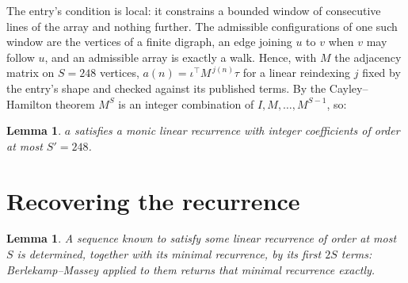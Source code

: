 \documentclass[11pt,a4paper]{article}
\theoremstyle{plain}
\newtheorem{lemma}[theorem]{Lemma}
\theoremstyle{definition}
\begin{document}
The entry's condition is local: it constrains a bounded window of consecutive lines of the
array and nothing further. The admissible configurations of one such window are the vertices
of a finite digraph, an edge joining $u$ to $v$ when $v$ may follow $u$, and an admissible
array is exactly a walk. Hence, with $M$ the adjacency matrix on $S=248$ vertices,
$a(n)=\iota^{\!\top}M^{\,j(n)}\tau$ for a linear reindexing $j$ fixed by the entry's shape
and checked against its published terms. By the Cayley--Hamilton theorem $M^{S}$ is an
integer combination of $I,M,\dots,M^{S-1}$, so:

\begin{lemma}\label{lem:cf}
$a$ satisfies a monic linear recurrence with integer coefficients of order at most
$S'=248$.
\end{lemma}

\section{Recovering the recurrence}

\begin{lemma}\label{lem:bm}
A sequence known to satisfy some linear recurrence of order at most $S$ is determined, together
with its minimal recurrence, by its first $2S$ terms: Berlekamp--Massey applied to them returns
that minimal recurrence exactly.
\end{lemma}
\end{document}
